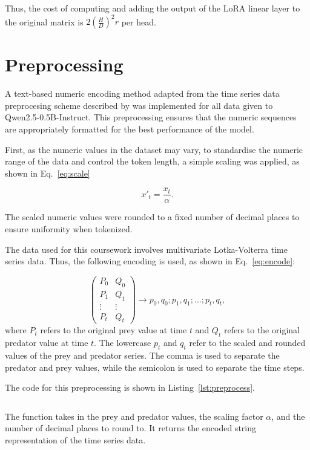 \documentclass[11pt,a4paper]{article}
\begin{document}
Thus, the cost of computing and adding the output of the LoRA linear layer to the original matrix is $2(\frac{H}{D})^2r$ per head.

\section{Preprocessing}
\label{zero}
A text-based numeric encoding method adapted from the time series data preprocesing scheme described by \citeauthor{gruver2024largelanguagemodelszeroshot} was implemented for all data given to Qwen2.5-0.5B-Instruct. This preprocessing ensures that the numeric sequences are appropriately formatted for the best performance of the model.

First, as the numeric values in the dataset may vary, to standardise the numeric range of the data and control the token length, a simple scaling was applied, as shown in Eq.~\ref{eq:scale}

\begin{equation}
    x'_t = \frac{x_t}{\alpha}.
    \label{eq:scale}
\end{equation}

The scaled numeric values were rounded to a fixed number of decimal places to ensure uniformity when tokenized.

The data used for this coursework involves multivariate Lotka-Volterra time series data. Thus, the following encoding is used, as shown in Eq.~\ref{eq:encode}:

\begin{equation}
    \begin{pmatrix}
        P_0 & Q_0 \\
        P_1 & Q_1 \\
        \vdots & \vdots \\
        P_t & Q_t 
        \end{pmatrix}  
        \rightarrow p_0,q_0;p_{1},q_{1};\ldots;p_{t},q_{t},
    \label{eq:encode}
\end{equation}
where $P_t$ refers to the original prey value at time $t$ and $Q_t$ refers to the original predator value at time $t$. The lowercase $p_t$ and $q_t$ refer to the scaled and rounded values of the prey and predator series. The comma is used to separate the predator and prey values, while the semicolon is used to separate the time steps.

The code for this preprocessing is shown in Listing~\ref{lst:preprocess}.

\begin{listing}[h]
\inputminted[firstline=60, lastline=79]{python}{../src/preprocessor.py}
\caption{The function takes in the prey and predator values, the scaling factor $\alpha$, and the number of decimal places to round to. It returns the encoded string representation of the time series data.}
\label{lst:preprocess}
\end{listing}
\end{document}
